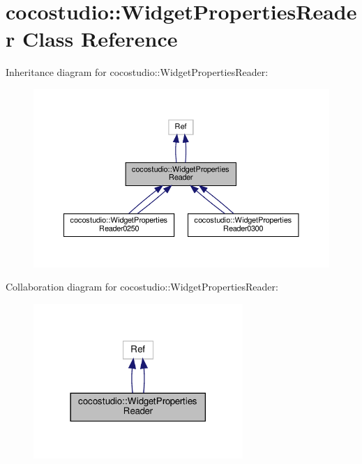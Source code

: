 \hypertarget{classcocostudio_1_1WidgetPropertiesReader}{}\section{cocostudio\+:\+:Widget\+Properties\+Reader Class Reference}
\label{classcocostudio_1_1WidgetPropertiesReader}


Inheritance diagram for cocostudio\+:\+:Widget\+Properties\+Reader\+:
\nopagebreak
\begin{figure}[H]
\begin{center}
\leavevmode
\includegraphics[width=350pt]{classcocostudio_1_1WidgetPropertiesReader__inherit__graph}
\end{center}
\end{figure}


Collaboration diagram for cocostudio\+:\+:Widget\+Properties\+Reader\+:
\nopagebreak
\begin{figure}[H]
\begin{center}
\leavevmode
\includegraphics[width=225pt]{classcocostudio_1_1WidgetPropertiesReader__coll__graph}
\end{center}
\end{figure}
